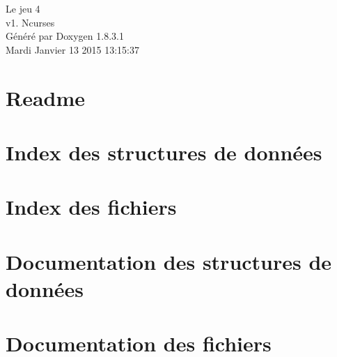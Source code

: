 \documentclass{book}
\begin{document}
\hypersetup{pageanchor=false,citecolor=blue}
\begin{titlepage}
\vspace*{7cm}
\begin{center}
{\Large Le jeu 4 \\[1ex]\large v1. Ncurses }\\
\vspace*{1cm}
{\large Généré par Doxygen 1.8.3.1}\\
\vspace*{0.5cm}
{\small Mardi Janvier 13 2015 13:15:37}\\
\end{center}
\end{titlepage}
\clearemptydoublepage
{}
\tableofcontents
\clearemptydoublepage
{}
\hypersetup{pageanchor=true,citecolor=blue}
\chapter{Readme}
\label{md_Readme}
\hypertarget{md_Readme}{}

\chapter{Index des structures de données}

\chapter{Index des fichiers}

\chapter{Documentation des structures de données}







\chapter{Documentation des fichiers}









\printindex
\end{document}
